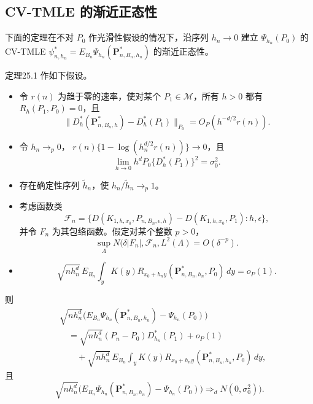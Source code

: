 \subsection{CV-TMLE 的渐近正态性}

下面的定理在不对 $P_0$ 作光滑性假设的情况下，沿序列 $h_n\to0$ 建立
$\Psi_{h_n}(P_0)$ 的 CV-TMLE
$\psi^*_{n,h_n}=E_{B_n}\Psi_{h_n}(\mathbf P^*_{n,B_n,h_n})$
的渐近正态性。

\begin{bookresult}{定理}{25.1}
作如下假设。
\begin{itemize}
\item 令 $r(n)$ 为趋于零的速率，使对某个
$P_1\in\mathcal M$，所有 $h>0$ 都有 $R_h(P_1,P_0)=0$，且
\begin{equation}
 \|D_h^*(\mathbf P^*_{n,B_n,h})-D_h^*(P_1)\|_{P_0}
 =O_P(h^{-d/2}r(n)).
\tag{25.3}
\end{equation}
\item 令 $h_n\to_p0$，
$r(n)\{1-\log(h_n^{d/2}r(n))\}\to0$，且
\begin{equation}
 \lim_{h\to0}h^dP_0\{D_h^*(P_1)\}^2=\sigma_0^2.
\tag{25.4}
\end{equation}
\item 存在确定性序列 $\tilde h_n$，使 $h_n/\tilde h_n\to_p1$。
\item 考虑函数类
\[
 \mathcal F_n=
 \{D(K_{1,h,x_0},P_{n,B_n,\epsilon,h})
  -D(K_{1,h,x_0},P_1):h,\epsilon\},
\]
并令 $F_n$ 为其包络函数。假定对某个整数 $p>0$，
\[
 \sup_\Lambda N(\delta|F_n|,\mathcal F_n,L^2(\Lambda)
 =O(\delta^{-p}).
\]
\item
\begin{equation}
 \sqrt{nh_n^d}\,E_{B_n}\int_y
 K(y)R_{x_0+h_ny}(\mathbf P^*_{n,B_n,h_n},P_0)\,dy=o_P(1).
\tag{25.5}
\end{equation}
\end{itemize}
则
\[
\begin{aligned}
 &\sqrt{nh_n^d}\bigl(
 E_{B_n}\Psi_{h_n}(\mathbf P^*_{n,B_n,h_n})-\Psi_{h_n}(P_0)\bigr)\\
 &\quad=\sqrt{nh_n^d}(P_n-P_0)D_{h_n}^*(P_1)+o_P(1)\\
 &\qquad+\sqrt{nh_n^d}\,E_{B_n}\int_y
 K(y)R_{x_0+h_ny}(\mathbf P^*_{n,B_n,h_n},P_0)\,dy,
\end{aligned}
\]
且
\[
 \sqrt{nh_n^d}\bigl(
 E_{B_n}\Psi_{h_n}(\mathbf P^*_{n,B_n,h_n})-\Psi_{h_n}(P_0)\bigr)
 \Rightarrow_dN(0,\sigma_0^2)).
\]
\end{bookresult}

